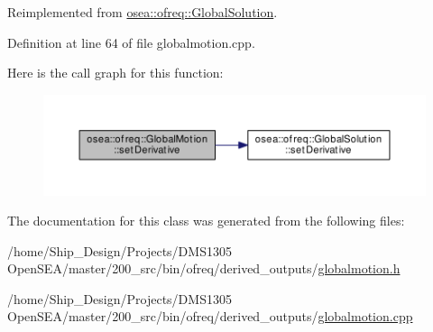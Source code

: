 Reimplemented from \hyperlink{classosea_1_1ofreq_1_1_global_solution_a537163391f1f55d073720b20f69acfa5}{osea\-::ofreq\-::\-Global\-Solution}.



Definition at line 64 of file globalmotion.\-cpp.



Here is the call graph for this function\-:
\nopagebreak
\begin{figure}[H]
\begin{center}
\leavevmode
\includegraphics[width=350pt]{classosea_1_1ofreq_1_1_global_motion_a15a8c0d57ffedf65a1cd84154cdaa6ae_cgraph}
\end{center}
\end{figure}




The documentation for this class was generated from the following files\-:\begin{DoxyCompactItemize}
\item 
/home/\-Ship\-\_\-\-Design/\-Projects/\-D\-M\-S1305 Open\-S\-E\-A/master/200\-\_\-src/bin/ofreq/derived\-\_\-outputs/\hyperlink{globalmotion_8h}{globalmotion.\-h}\item 
/home/\-Ship\-\_\-\-Design/\-Projects/\-D\-M\-S1305 Open\-S\-E\-A/master/200\-\_\-src/bin/ofreq/derived\-\_\-outputs/\hyperlink{globalmotion_8cpp}{globalmotion.\-cpp}\end{DoxyCompactItemize}
